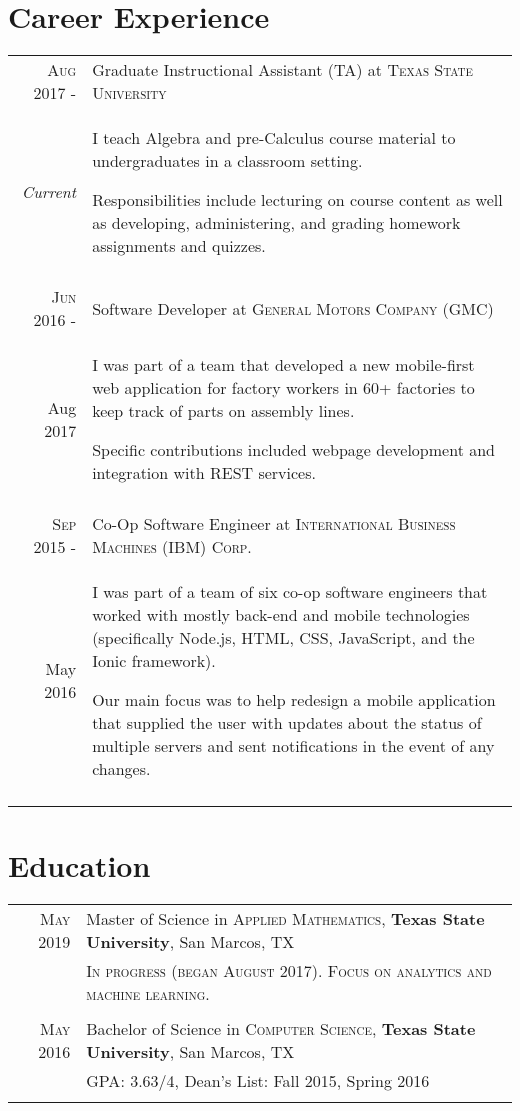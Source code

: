 \documentclass[a4paper,10pt]{article}
\begin{document}
\section{Career Experience}
\begin{tabular}{r|p{12cm}}
\textsc{Aug 2017 -} & Graduate Instructional Assistant (TA) at \textsc{Texas State University} \\
\emph{Current} & \footnotesize{I teach Algebra and pre-Calculus course material to undergraduates in a classroom setting.
 
 	Responsibilities include lecturing on course content as well as developing, administering, and grading homework assignments and quizzes.} \\
 \multicolumn{2}{c}{} \\
 
 \textsc{Jun 2016 -} & Software Developer at \textsc{General Motors Company (GMC)} \\
Aug 2017 & \footnotesize{I was part of a team that developed a new mobile-first web application for factory workers in 60+ factories to keep track of parts on assembly lines.

Specific contributions included webpage development and integration with REST services.
} \\
 \multicolumn{2}{c}{} \\
 
 \textsc{Sep 2015 -} & Co-Op Software Engineer at \textsc{International Business Machines (IBM) Corp.} \\
 May 2016 & \footnotesize{I was part of a team of six co-op software engineers that worked with mostly back-end and mobile technologies (specifically Node.js, HTML, CSS, JavaScript, and the Ionic framework).

Our main focus was to help redesign a mobile application that supplied the user with updates about the status of multiple servers and sent notifications in the event of any changes.} \\
 \multicolumn{2}{c}{} \\
\end{tabular}

\section{Education}
\begin{tabular}{rl}	
 \textsc{May} 2019 & Master of Science in \textsc{Applied Mathematics}, \textbf{Texas State University}, San Marcos, TX\\
 
&\textsc{In progress (began August 2017). Focus on analytics and machine learning.} \\ & \\

\textsc{May} 2016 & Bachelor of Science in \textsc{Computer Science}, \textbf{Texas State University}, San Marcos, TX \\

&\normalsize \textsc{GPA}: 3.63/4, Dean’s List: Fall 2015, Spring 2016 \\&\\
\end{tabular}
\end{document}
